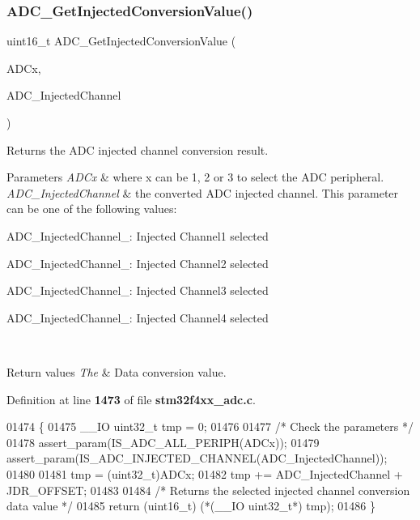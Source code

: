 \subsubsection{A\+D\+C\+\_\+\+Get\+Injected\+Conversion\+Value()}
{\footnotesize\ttfamily uint16\+\_\+t A\+D\+C\+\_\+\+Get\+Injected\+Conversion\+Value (\begin{DoxyParamCaption}\item[{\textbf{ A\+D\+C\+\_\+\+Type\+Def} $\ast$}]{A\+D\+Cx,  }\item[{uint8\+\_\+t}]{A\+D\+C\+\_\+\+Injected\+Channel }\end{DoxyParamCaption})}



Returns the A\+DC injected channel conversion result. 


\begin{DoxyParams}{Parameters}
{\em A\+D\+Cx} & where x can be 1, 2 or 3 to select the A\+DC peripheral. \\
\hline
{\em A\+D\+C\+\_\+\+Injected\+Channel} & the converted A\+DC injected channel. This parameter can be one of the following values\+: \begin{DoxyItemize}
\item A\+D\+C\+\_\+\+Injected\+Channel\+\_\+: Injected Channel1 selected \item A\+D\+C\+\_\+\+Injected\+Channel\+\_\+: Injected Channel2 selected \item A\+D\+C\+\_\+\+Injected\+Channel\+\_\+: Injected Channel3 selected \item A\+D\+C\+\_\+\+Injected\+Channel\+\_\+: Injected Channel4 selected \end{DoxyItemize}
\\
\hline
\end{DoxyParams}

\begin{DoxyRetVals}{Return values}
{\em The} & Data conversion value. \\
\hline
\end{DoxyRetVals}


Definition at line \textbf{ 1473} of file \textbf{ stm32f4xx\+\_\+adc.\+c}.


\begin{DoxyCode}
01474 \{
01475   \_\_IO uint32\_t tmp = 0;
01476   
01477   \textcolor{comment}{/* Check the parameters */}
01478   assert_param(IS_ADC_ALL_PERIPH(ADCx));
01479   assert_param(IS_ADC_INJECTED_CHANNEL(ADC\_InjectedChannel));
01480 
01481   tmp = (uint32\_t)ADCx;
01482   tmp += ADC\_InjectedChannel + JDR_OFFSET;
01483   
01484   \textcolor{comment}{/* Returns the selected injected channel conversion data value */}
01485   \textcolor{keywordflow}{return} (uint16\_t) (*(\_\_IO uint32\_t*)  tmp); 
01486 \}
\end{DoxyCode}
\mbox{\label{group__ADC__Group6_ga8765f8835b8cfed13dce3d8d71767dcc}} 
